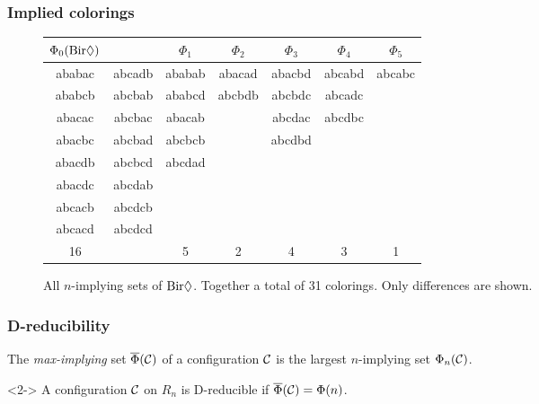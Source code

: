 \begin{frame}
    \frametitle{Implied colorings}

    \begin{figure}[!ht]
        \centering
        \begin{tabular}{ ccccccc }
            $\Phi_0(\text{Bir}\Diamond) $ & & $\Phi_1$ & $\Phi_2$ & $\Phi_3$ & $\Phi_4$ & $\Phi_5$ \\
            \hline
            ababac & abcadb & ababab & abacad & abacbd & abcabd & abcabc \\
            ababcb & abcbab & ababcd & abcbdb & abcbdc & abcadc & \\
            abacac & abcbac & abacab &        & abcdac & abcdbc & \\
            abacbc & abcbad & abcbcb &        & abcdbd &        & \\
            abacdb & abcbcd & abcdad &        &        &        & \\
            abacdc & abcdab \\
            abcacb & abcdcb \\
            abcacd & abcdcd \\
            \hline
            16 & & 5 & 2 & 4 & 3 & 1 \\
        \end{tabular}
        \caption{ All $n$-implying sets of $\text{Bir}\Diamond$. Together a total of 31 colorings. Only differences are shown. }
    \end{figure}
\end{frame}

\begin{frame}
    \frametitle{D-reducibility}

    \begin{definition}
        The \emph{max-implying} set $\overline{\Phi}(\mathcal{C})$ of a configuration $\mathcal{C}$ is the largest $n$-implying set  $\Phi_n(\mathcal{C})$.
    \end{definition}
    
    \begin{definition}<2->
        A configuration $\mathcal{C}$ on $R_n$ is D-reducible if $\overline{\Phi}(\mathcal{C}) = \Phi(n)$.
    \end{definition}

    
\end{frame}

